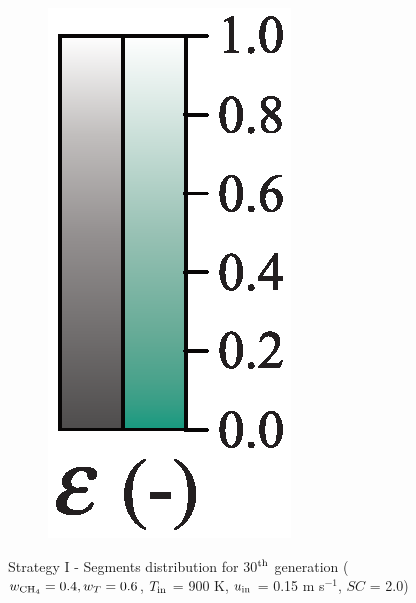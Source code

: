 \documentclass[preprint,12pt]{elsarticle}
\begin{document}
\begin{figure}
\begin{subfigure}[b]{0.1\textwidth}
     	\includegraphics[width=\textwidth]{segments_porosity.eps}
     \end{subfigure}
\caption{\label{fig:30L4060-seg} Strategy I - Segments distribution for 30$^{\rm{th}}$ generation ($w_{\rm{CH_4}} = 0.4, w_T = 0.6$, $T_{\rm{in}}$ = 900 K, $u_{\rm{in}}$ = 0.15 m s$^{-1}$, $SC$ = 2.0)}
\end{figure}
\end{document}
